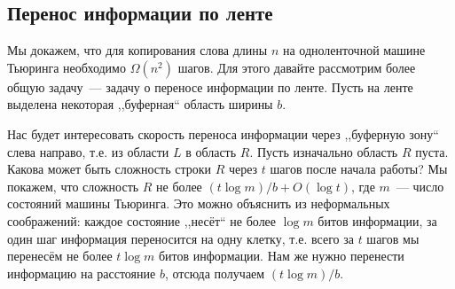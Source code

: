\documentclass[12pt]{article}
\theoremstyle{definition}
\theoremstyle{plain}
\theoremstyle{remark}
\begin{document}
\subsection{Перенос информации по ленте}
Мы докажем, что для копирования слова длины $n$ на одноленточной машине Тьюринга
необходимо $\Omega(n^2)$ шагов. Для этого давайте рассмотрим более общую задачу~—
задачу о переносе информации по ленте. Пусть на ленте выделена некоторая ,,буферная``
область ширины $b$.
\begin{center}
\end{center}
Нас будет интересовать скорость переноса информации через ,,буферную зону`` слева направо,
т.е. из области $L$ в область $R$. Пусть изначально область $R$ пуста. Какова может быть
сложность строки $R$ через $t$ шагов после начала работы? Мы покажем, что сложность $R$
не более $(t\log m)/b + O(\log t)$, где $m$~--- число состояний машины Тьюринга. Это
можно объяснить из неформальных соображений: каждое состояние ,,несёт`` не более $\log m$
битов информации, за один шаг информация переносится на одну клетку, т.е. всего за $t$
шагов мы перенесём не более $t\log m$ битов информации. Нам же нужно перенести информацию
на расстояние $b$, отсюда получаем $(t\log m) / b$.
\end{document}
